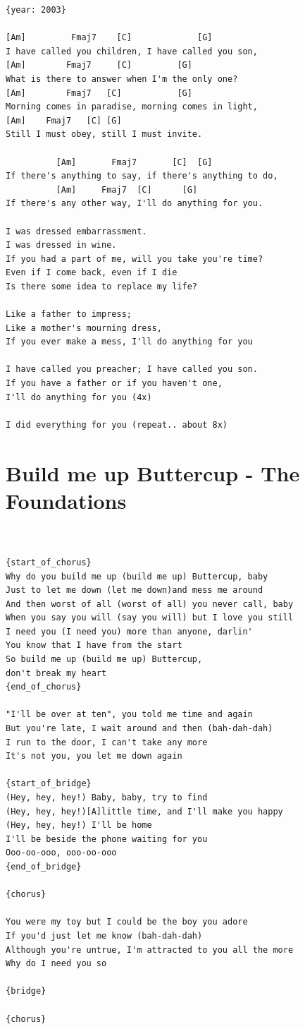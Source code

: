 \documentclass[
]{book}
\let\stdsection\section
\renewcommand\section{\clearpage\stdsection}
\begin{document}
\begin{verbatim}
{year: 2003}

[Am]         Fmaj7    [C]             [G]
I have called you children, I have called you son,
[Am]        Fmaj7     [C]         [G]
What is there to answer when I'm the only one?
[Am]        Fmaj7   [C]           [G]
Morning comes in paradise, morning comes in light,
[Am]    Fmaj7   [C] [G]
Still I must obey, still I must invite.

          [Am]       Fmaj7       [C]  [G]
If there's anything to say, if there's anything to do,
          [Am]     Fmaj7  [C]      [G]
If there's any other way, I'll do anything for you.

I was dressed embarrassment. 
I was dressed in wine. 
If you had a part of me, will you take you're time? 
Even if I come back, even if I die 
Is there some idea to replace my life? 

Like a father to impress; 
Like a mother's mourning dress, 
If you ever make a mess, I'll do anything for you 

I have called you preacher; I have called you son. 
If you have a father or if you haven't one, 
I'll do anything for you (4x)

I did everything for you (repeat.. about 8x)
\end{verbatim}

\hypertarget{build-me-up-buttercup---the-foundations}{%
\section{Build me up Buttercup - The Foundations}\label{build-me-up-buttercup---the-foundations}}

\begin{verbatim}


{start_of_chorus}
Why do you build me up (build me up) Buttercup, baby
Just to let me down (let me down)and mess me around
And then worst of all (worst of all) you never call, baby
When you say you will (say you will) but I love you still
I need you (I need you) more than anyone, darlin'
You know that I have from the start
So build me up (build me up) Buttercup, 
don't break my heart
{end_of_chorus}

"I'll be over at ten", you told me time and again
But you're late, I wait around and then (bah-dah-dah)
I run to the door, I can't take any more
It's not you, you let me down again

{start_of_bridge}
(Hey, hey, hey!) Baby, baby, try to find
(Hey, hey, hey!)[A]little time, and I'll make you happy
(Hey, hey, hey!) I'll be home
I'll be beside the phone waiting for you
Ooo-oo-ooo, ooo-oo-ooo
{end_of_bridge}

{chorus}

You were my toy but I could be the boy you adore
If you'd just let me know (bah-dah-dah)
Although you're untrue, I'm attracted to you all the more
Why do I need you so

{bridge}

{chorus}

\end{verbatim}
\end{document}
